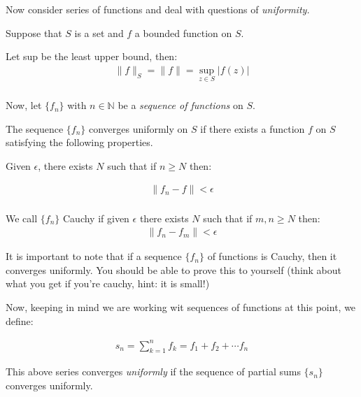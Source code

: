 Now consider series of functions and deal with questions of \emph{uniformity.}

Suppose that $S$ is a set and $f$ a bounded function on $S$.

\begin{defn}
  Let sup be the least upper bound, then:
  \begin{align*}
    \| f \|_S = \| f \| = \sup_{z \in S} | f(z) | \\
  \end{align*}
\end{defn}

Now, let $\{ f_n \}$ with $n \in \mathbb{N}$ be a \emph{sequence of functions} on $S$.

\begin{defn}
  The sequence $ \{ f_n \}$ converges uniformly on $S$ if there exists a 
  function $f$ on $S$ satisfying the following properties.

  Given $\epsilon$, there exists $N$ such that if $n \geq N$ then:

  \begin{align*}
    \| f_n - f \| < \epsilon \\
  \end{align*}
\end{defn}

\begin{defn}
  We call $\{f_n\}$ Cauchy if given $\epsilon$ there exists $N$ such that if $m, n \geq N$ then:
  \begin{align*}
    \| f_n - f_m \| < \epsilon
  \end{align*}
\end{defn}

It is important to note that if a sequence $\{f_n\}$ of functions is Cauchy, then it converges 
uniformly. You should be able to prove this to yourself (think about what you get if you're cauchy, hint: it 
is small!)

Now, keeping in mind we are working wit sequences of functions at this point, we define:

\begin{defn}
  \begin{align*}
    s_n = \sum_{k = 1}^{n} f_k = f_1 + f_2 + \cdots f_n
  \end{align*}
\end{defn}

This above series converges \emph{uniformly} if the sequence of partial sums $\{s_n\}$ converges uniformly.

